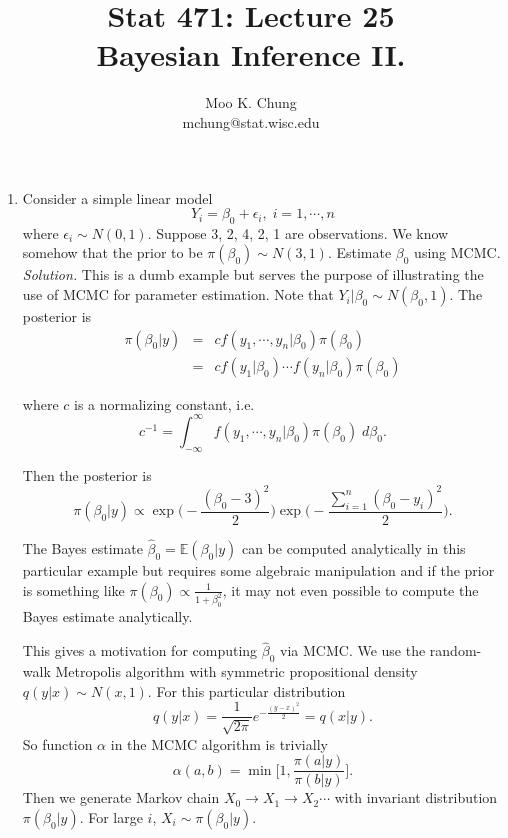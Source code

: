 \documentclass[11pt,twocolumn]{article} %
\newcommand{\bqn}{\begin{eqnarray}}
\newcommand{\eqn}{\end{eqnarray}}
\begin{document}
\title{Stat 471: Lecture 25\\
Bayesian Inference II.}
\author{Moo K. Chung\\
mchung@stat.wisc.edu}
\maketitle \thispagestyle{empty}
\begin{enumerate}

\item Consider a simple linear model $$Y_i = \beta_0 + \epsilon_i,
\; i=1,\cdots,n$$ where $\epsilon_i \sim N(0,1)$. Suppose 3, 2, 4,
2, 1 are observations. We know somehow that the prior to be
$\pi(\beta_0)
\sim N(3,1)$. Estimate $\beta_0$ using MCMC.\\

{\em Solution.} This is a dumb example but serves the purpose of
illustrating the use of MCMC for parameter estimation. Note that
$Y_i|\beta_0 \sim N(\beta_0, 1)$. The posterior is
\bqn\pi(\beta_0|y) &=& cf(y_1,\cdots,y_n|\beta_0)\pi(\beta_0)\\
&=& cf(y_1|\beta_0)\cdots f(y_n|\beta_0)\pi(\beta_0) \eqn

where $c$ is a normalizing constant, i.e.
$$c^{-1}=\int_{-\infty}^{\infty}
f(y_1,\cdots,y_n|\beta_0)\pi(\beta_0) \; d\beta_0.$$

Then the posterior is
$$\pi(\beta_0|y) \propto \exp \Big(-\frac{(\beta_0-3)^2}{2}\Big)
\exp \Big(-\frac{\sum_{i=1}^n(\beta_0-y_i)^2}{2}\Big).$$

The Bayes estimate $\hat \beta_0 = \mathbb{E}(\beta_0|y)$ can be
computed analytically in this particular example but requires some
algebraic manipulation and if the prior is something like
$\pi(\beta_0) \propto \frac{1}{1+\beta_0^2}$, it may not even
possible to compute the Bayes estimate analytically.

This gives a motivation for computing $\hat \beta_0$ via MCMC. We
use the random-walk Metropolis algorithm with symmetric
propositional density $q(y|x) \sim N(x,1)$. For this particular
distribution
$$q(y|x)=\frac{1}{\sqrt{2\pi}} e^{-\frac{(y-x)^2}{2}} =
q(x|y).$$
 So function $\alpha$ in the MCMC algorithm is trivially
$$\alpha(a,b) = \min \Big[1, \frac{\pi(a|y)}{\pi(b|y)}\Big].$$
Then we generate Markov chain $X_0 \to X_1 \to X_2 \cdots$ with
invariant distribution $\pi(\beta_0|y)$. For large $i$, $X_i \sim
\pi(\beta_0|y)$.


\end{enumerate}
\end{document}
